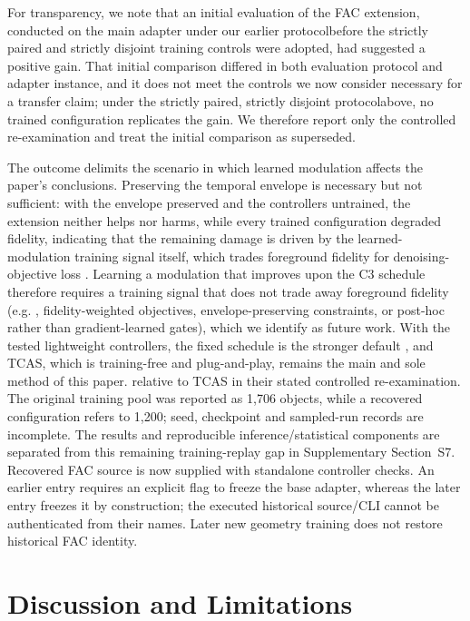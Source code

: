 \documentclass[times,twocolumn,final]{elsarticle}
\providecommand{\DIFadd}[1]{{\protect\color{blue} \sf #1}} %
\providecommand{\DIFdel}[1]{{\protect\color{red} \scriptsize #1}} %
\providecommand{\DIFaddbegin}{} %
\providecommand{\DIFaddend}{} %
\providecommand{\DIFdelend}{} %
\begin{document}
\DIFdel{For transparency, we note that an initial evaluation of the FAC extension, conducted on the main adapter under our earlier protocolbefore the strictly paired and strictly disjoint training controls were adopted, had suggested a positive gain. That initial comparison differed in both evaluation protocol and adapter instance, and it does not meet the controls we now consider necessary for a transfer claim; under the strictly paired, strictly disjoint protocolabove, no trained configuration replicates the gain. We therefore report only the controlled re-examination and treat the initial comparison as superseded. }%

\DIFdel{The outcome delimits the scenario in which learned modulation affects the paper's conclusions. Preserving the temporal envelope is necessary but not sufficient: with the envelope preserved and the controllers untrained, the extension neither helps nor harms, while every trained configuration degraded fidelity, indicating that the remaining damage is driven by the learned-modulation training signal itself, which trades foreground fidelity for denoising-objective loss . Learning a modulation that improves upon the C3 schedule therefore requires a training signal that does not trade away foreground fidelity (e.g.
, fidelity-weighted objectives, envelope-preserving constraints, or post-hoc rather than gradient-learned gates), which we identify as future work. With the tested lightweight controllers, the fixed schedule is the stronger default , and TCAS, which is training-free and plug-and-play, remains the main and sole method of this paper. }\DIFdelend \DIFaddbegin \DIFadd{relative to TCAS in their stated controlled re-examination. The original training pool was reported as 1,706 objects, while a recovered configuration refers to 1,200; seed, checkpoint and sampled-run records are incomplete. The results and reproducible inference/statistical components are separated from this remaining training-replay gap in Supplementary Section~S7. Recovered FAC source is now supplied with standalone controller checks. An earlier entry requires an explicit flag to freeze the base adapter, whereas the later entry freezes it by construction; the executed historical source/CLI cannot be authenticated from their names. Later new geometry training does not restore historical FAC identity.
}\DIFaddend 


\FloatBarrier
\DIFaddbegin \section{Discussion and Limitations}
\label{sec:limitations}
\DIFaddend 
\end{document}
